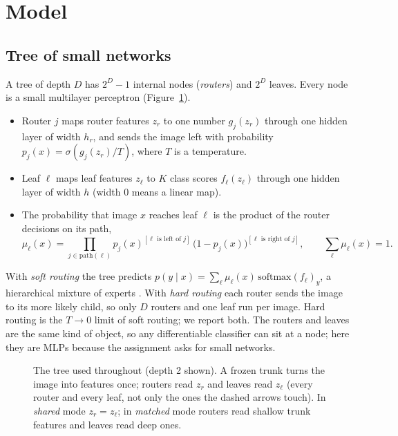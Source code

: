 \section{Model}
\label{sec:model}

\subsection{Tree of small networks}
A tree of depth $D$ has $2^D-1$ internal nodes (\emph{routers}) and $2^D$ leaves. Every node is a small multilayer perceptron (Figure~\ref{fig:arch}).
\begin{itemize}
\item Router $j$ maps router features $z_r$ to one number $g_j(z_r)$ through one hidden layer of width $h_r$, and sends the image left with probability $p_j(x)=\sigma\!\left(g_j(z_r)/T\right)$, where $T$ is a temperature.
\item Leaf $\ell$ maps leaf features $z_\ell$ to $K$ class scores $f_\ell(z_\ell)$ through one hidden layer of width $h$ (width $0$ means a linear map).
\item The probability that image $x$ reaches leaf $\ell$ is the product of the router decisions on its path,
\[
\mu_\ell(x)=\prod_{j\in\mathrm{path}(\ell)} p_j(x)^{[\ell\text{ is left of }j]}\,\bigl(1-p_j(x)\bigr)^{[\ell\text{ is right of }j]},\qquad \sum_\ell \mu_\ell(x)=1 .
\]
\end{itemize}
With \emph{soft routing} the tree predicts $p(y\mid x)=\sum_\ell \mu_\ell(x)\,\mathrm{softmax}(f_\ell)_y$, a hierarchical mixture of experts \cite{jordan1994}. With \emph{hard routing} each router sends the image to its more likely child, so only $D$ routers and one leaf run per image. Hard routing is the $T\to 0$ limit of soft routing; we report both. The routers and leaves are the same kind of object, so any differentiable classifier can sit at a node; here they are MLPs because the assignment asks for small networks.

\begin{figure}[t]
\centering

\caption{The tree used throughout (depth 2 shown). A frozen trunk turns the image into features once; routers read $z_r$ and leaves read $z_\ell$ (every router and every leaf, not only the ones the dashed arrows touch). In \emph{shared} mode $z_r=z_\ell$; in \emph{matched} mode routers read shallow trunk features and leaves read deep ones.}
\label{fig:arch}
\end{figure}


